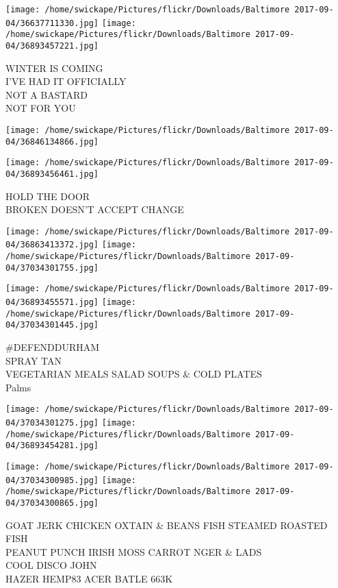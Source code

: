 \documentclass[10pt,letterpaper]{article}
\begin{document}
\texttt{[image: /home/swickape/Pictures/flickr/Downloads/Baltimore 2017-09-04/36637711330.jpg]}
\texttt{[image: /home/swickape/Pictures/flickr/Downloads/Baltimore 2017-09-04/36893457221.jpg]}

WINTER IS COMING\\
I'VE HAD IT OFFICIALLY\\
NOT A BASTARD\\
NOT FOR YOU
\pagebreak

\texttt{[image: /home/swickape/Pictures/flickr/Downloads/Baltimore 2017-09-04/36846134866.jpg]}

\vspace{0.25in}
\texttt{[image: /home/swickape/Pictures/flickr/Downloads/Baltimore 2017-09-04/36893456461.jpg]}

HOLD THE DOOR\\
BROKEN DOESN'T ACCEPT CHANGE
\pagebreak

\texttt{[image: /home/swickape/Pictures/flickr/Downloads/Baltimore 2017-09-04/36863413372.jpg]}
\texttt{[image: /home/swickape/Pictures/flickr/Downloads/Baltimore 2017-09-04/37034301755.jpg]}

\texttt{[image: /home/swickape/Pictures/flickr/Downloads/Baltimore 2017-09-04/36893455571.jpg]}
\texttt{[image: /home/swickape/Pictures/flickr/Downloads/Baltimore 2017-09-04/37034301445.jpg]}

\#DEFENDDURHAM\\
SPRAY TAN\\
VEGETARIAN MEALS SALAD SOUPS \& COLD PLATES\\
Palms
\pagebreak

\texttt{[image: /home/swickape/Pictures/flickr/Downloads/Baltimore 2017-09-04/37034301275.jpg]}
\texttt{[image: /home/swickape/Pictures/flickr/Downloads/Baltimore 2017-09-04/36893454281.jpg]}

\texttt{[image: /home/swickape/Pictures/flickr/Downloads/Baltimore 2017-09-04/37034300985.jpg]}
\texttt{[image: /home/swickape/Pictures/flickr/Downloads/Baltimore 2017-09-04/37034300865.jpg]}

GOAT JERK CHICKEN OXTAIN \& BEANS FISH STEAMED ROASTED FISH\\
PEANUT PUNCH IRISH MOSS CARROT NGER \& LADS\\
COOL DISCO JOHN\\
HAZER HEMP83 ACER BATLE 663K
\pagebreak
\end{document}
